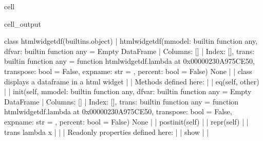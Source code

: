 \documentclass[letterpaper,10pt,english]{jupyterBook}
\begin{document}
\begin{sphinxuseclass}{cell}
\begin{sphinxVerbatimOutput}
\begin{sphinxuseclass}{cell_output}
\begin{sphinxVerbatim}[commandchars=\\\{\}]
    class htmlwidget\PYGZus{}df(builtins.object)
     |  htmlwidget\PYGZus{}df(mmodel: \PYGZlt{}built\PYGZhy{}in function any\PYGZgt{}, df\PYGZus{}var: \PYGZlt{}built\PYGZhy{}in function any\PYGZgt{} = Empty DataFrame
     |  Columns: []
     |  Index: [], trans: \PYGZlt{}built\PYGZhy{}in function any\PYGZgt{} = \PYGZlt{}function htmlwidget\PYGZus{}df.\PYGZlt{}lambda\PYGZgt{} at 0x00000230A975CE50\PYGZgt{}, transpose: bool = False, expname: str = \PYGZsq{}\PYGZsq{}, percent: bool = False) \PYGZhy{}\PYGZgt{} None
     |  
     |  class displays a dataframe in a html widget
     |  
     |  Methods defined here:
     |  
     |  \PYGZus{}\PYGZus{}eq\PYGZus{}\PYGZus{}(self, other)
     |  
     |  \PYGZus{}\PYGZus{}init\PYGZus{}\PYGZus{}(self, mmodel: \PYGZlt{}built\PYGZhy{}in function any\PYGZgt{}, df\PYGZus{}var: \PYGZlt{}built\PYGZhy{}in function any\PYGZgt{} = Empty DataFrame
     |  Columns: []
     |  Index: [], trans: \PYGZlt{}built\PYGZhy{}in function any\PYGZgt{} = \PYGZlt{}function htmlwidget\PYGZus{}df.\PYGZlt{}lambda\PYGZgt{} at 0x00000230A975CE50\PYGZgt{}, transpose: bool = False, expname: str = \PYGZsq{}\PYGZsq{}, percent: bool = False) \PYGZhy{}\PYGZgt{} None
     |  
     |  \PYGZus{}\PYGZus{}post\PYGZus{}init\PYGZus{}\PYGZus{}(self)
     |  
     |  \PYGZus{}\PYGZus{}repr\PYGZus{}\PYGZus{}(self)
     |  
     |  trans lambda x
     |  
     |  \PYGZhy{}\PYGZhy{}\PYGZhy{}\PYGZhy{}\PYGZhy{}\PYGZhy{}\PYGZhy{}\PYGZhy{}\PYGZhy{}\PYGZhy{}\PYGZhy{}\PYGZhy{}\PYGZhy{}\PYGZhy{}\PYGZhy{}\PYGZhy{}\PYGZhy{}\PYGZhy{}\PYGZhy{}\PYGZhy{}\PYGZhy{}\PYGZhy{}\PYGZhy{}\PYGZhy{}\PYGZhy{}\PYGZhy{}\PYGZhy{}\PYGZhy{}\PYGZhy{}\PYGZhy{}\PYGZhy{}\PYGZhy{}\PYGZhy{}\PYGZhy{}\PYGZhy{}\PYGZhy{}\PYGZhy{}\PYGZhy{}\PYGZhy{}\PYGZhy{}\PYGZhy{}\PYGZhy{}\PYGZhy{}\PYGZhy{}\PYGZhy{}\PYGZhy{}\PYGZhy{}\PYGZhy{}\PYGZhy{}\PYGZhy{}\PYGZhy{}\PYGZhy{}\PYGZhy{}\PYGZhy{}\PYGZhy{}\PYGZhy{}\PYGZhy{}\PYGZhy{}\PYGZhy{}\PYGZhy{}\PYGZhy{}\PYGZhy{}\PYGZhy{}\PYGZhy{}\PYGZhy{}\PYGZhy{}\PYGZhy{}\PYGZhy{}\PYGZhy{}\PYGZhy{}
     |  Readonly properties defined here:
     |  
     |  show
     |  
     |  \PYGZhy{}\PYGZhy{}\PYGZhy{}\PYGZhy{}\PYGZhy{}\PYGZhy{}\PYGZhy{}\PYGZhy{}\PYGZhy{}\PYGZhy{}\PYGZhy{}\PYGZhy{}\PYGZhy{}\PYGZhy{}\PYGZhy{}\PYGZhy{}\PYGZhy{}\PYGZhy{}\PYGZhy{}\PYGZhy{}\PYGZhy{}\PYGZhy{}\PYGZhy{}\PYGZhy{}\PYGZhy{}\PYGZhy{}\PYGZhy{}\PYGZhy{}\PYGZhy{}\PYGZhy{}\PYGZhy{}\PYGZhy{}\PYGZhy{}\PYGZhy{}\PYGZhy{}\PYGZhy{}\PYGZhy{}\PYGZhy{}\PYGZhy{}\PYGZhy{}\PYGZhy{}\PYGZhy{}\PYGZhy{}\PYGZhy{}\PYGZhy{}\PYGZhy{}\PYGZhy{}\PYGZhy{}\PYGZhy{}\PYGZhy{}\PYGZhy{}\PYGZhy{}\PYGZhy{}\PYGZhy{}\PYGZhy{}\PYGZhy{}\PYGZhy{}\PYGZhy{}\PYGZhy{}\PYGZhy{}\PYGZhy{}\PYGZhy{}\PYGZhy{}\PYGZhy{}\PYGZhy{}\PYGZhy{}\PYGZhy{}\PYGZhy{}\PYGZhy{}\PYGZhy{}

\end{sphinxVerbatim}
\end{sphinxuseclass}
\end{sphinxVerbatimOutput}
\end{sphinxuseclass}
\end{document}
